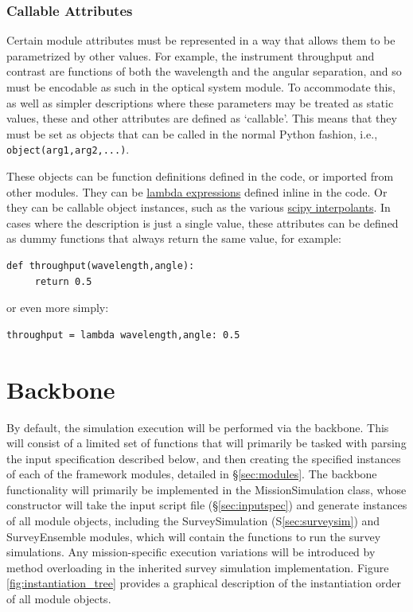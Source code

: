 \documentclass[cleanfoot]{asme2ej}
\newcommand{\reffig}[1]{Figure \ref{#1}}
\begin{document}
\subsubsection{Callable Attributes}
Certain module attributes must be represented in a way that allows them to be parametrized by other values.  For example, the instrument throughput and contrast are functions of both the wavelength and the angular separation, and so must be encodable as such in the optical system module.  To accommodate this, as well as simpler descriptions where these parameters may be treated as static values, these and other attributes are defined as `callable'.  This means that they must be set as objects that can be called in the normal Python fashion, i.e., \verb+object(arg1,arg2,...)+.  

These objects can be function definitions defined in the code, or imported from other modules.  They can be \href{https://docs.python.org/2/reference/expressions.html#lambda}{lambda expressions} defined inline in the code.  Or they can be callable object instances, such as the various \href{http://docs.scipy.org/doc/scipy/reference/interpolate.html}{scipy interpolants}.  In cases where the description is just a single value, these attributes can be defined as dummy functions that always return the same value, for example:
\begin{verbatim}
def throughput(wavelength,angle):
     return 0.5
\end{verbatim}
or even more simply:
\begin{verbatim}
throughput = lambda wavelength,angle: 0.5
\end{verbatim}

\section{Backbone}
By default, the simulation execution will be performed via the backbone.  This will consist of a limited set of functions that will primarily be tasked with parsing the input specification described below, and then creating the specified instances of each of the framework modules, detailed in \S\ref{sec:modules}.  The backbone functionality will primarily be implemented in the MissionSimulation class, whose constructor will take the input script file (\S\ref{sec:inputspec}) and generate instances of all module objects, including the SurveySimulation (S\ref{sec:surveysim}) and SurveyEnsemble modules, which will contain the functions to run the survey simulations. Any mission-specific execution variations will be introduced by method overloading in the inherited survey simulation implementation. \reffig{fig:instantiation_tree} provides a graphical description of the instantiation order of all module objects.
\end{document}
